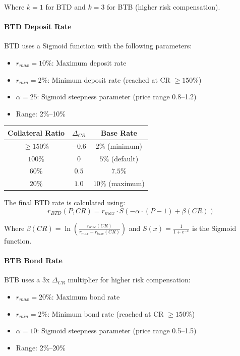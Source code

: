 \documentclass{article}
\begin{document}
Where $k = 1$ for BTD and $k = 3$ for BTB (higher risk compensation).

\paragraph{BTD Deposit Rate}
BTD uses a Sigmoid function with the following parameters:
\begin{itemize}
  \item $r_{max} = 10\%$: Maximum deposit rate
  \item $r_{min} = 2\%$: Minimum deposit rate (reached at CR $\geq 150\%$)
  \item $\alpha = 25$: Sigmoid steepness parameter (price range 0.8--1.2)
  \item Range: 2\%--10\%
\end{itemize}

\begin{center}
\begin{tabular}{ccc}
\toprule
Collateral Ratio & $\Delta_{CR}$ & Base Rate \\
\midrule
$\geq 150\%$ & $-0.6$ & $2\%$ (minimum) \\
$100\%$ & $0$ & $5\%$ (default) \\
$60\%$ & $0.5$ & $7.5\%$ \\
$20\%$ & $1.0$ & $10\%$ (maximum) \\
\bottomrule
\end{tabular}
\end{center}

The final BTD rate is calculated using:
\begin{equation}
r_{BTD}(P, CR) = r_{max} \cdot S\left(-\alpha \cdot (P - 1) + \beta(CR)\right)
\end{equation}

Where $\beta(CR) = \ln\left(\frac{r_{base}(CR)}{r_{max} - r_{base}(CR)}\right)$ and $S(x) = \frac{1}{1 + e^{-x}}$ is the Sigmoid function.

\paragraph{BTB Bond Rate}
BTB uses a 3x $\Delta_{CR}$ multiplier for higher risk compensation:
\begin{itemize}
  \item $r_{max} = 20\%$: Maximum bond rate
  \item $r_{min} = 2\%$: Minimum bond rate (reached at CR $\geq 150\%$)
  \item $\alpha = 10$: Sigmoid steepness parameter (price range 0.5--1.5)
  \item Range: 2\%--20\%
\end{itemize}
\end{document}
